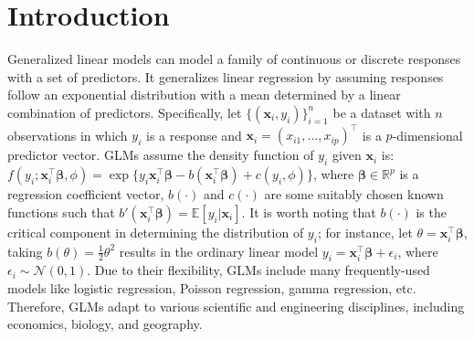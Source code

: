 \section{Introduction}
Generalized linear models \citep*[GLMs, ][]{mccullagh1989generalized} can model a family of continuous or discrete responses with a set of predictors.
It generalizes linear regression by assuming responses follow an exponential distribution with a mean determined by a linear combination of predictors.
Specifically, let $\{(\boldsymbol{x}_i, y_i)\}^{n}_{i=1}$ be a dataset with $n$ observations
in which $y_i$ is a response and $\boldsymbol x_i = (x_{i1}, \ldots, x_{ip})^\top$ is
a $p$-dimensional predictor vector.
GLMs assume the density function of $y_i$ given $\boldsymbol x_i$ is:
$f(y_i;\boldsymbol{x}_i^\top \boldsymbol{\beta},\phi) = \exp\{y_i\boldsymbol{x}_i^\top \boldsymbol{\beta} - b(\boldsymbol{x}_i^\top \boldsymbol{\beta}) + c(y_i,\phi)\}$,
where $\boldsymbol \beta \in \mathbb{R}^p$ is a regression coefficient vector,
$b(\cdot)$ and $c(\cdot)$ are some suitably chosen known functions
such that $b'(\boldsymbol{x}_i^\top \boldsymbol{\beta}) = \mathbb{E}[y_i|\boldsymbol {x}_i]$.
It is worth noting that $b(\cdot)$ is the critical component in determining the distribution of $y_i$;
for instance, let $\theta = \boldsymbol{x}_i^\top \boldsymbol{\beta}$,
taking $b(\theta)=\frac{1}{2}\theta^2$ results in the ordinary linear model
$y_i = \boldsymbol{x}_i^\top \boldsymbol{\beta} + \epsilon_i$, where $\epsilon_i \sim \mathcal{N}(0, 1)$.
Due to their flexibility, GLMs include many frequently-used models like logistic regression, Poisson regression, gamma regression, etc.
Therefore, GLMs adapt to various scientific and engineering disciplines,
including economics, biology, and geography.

